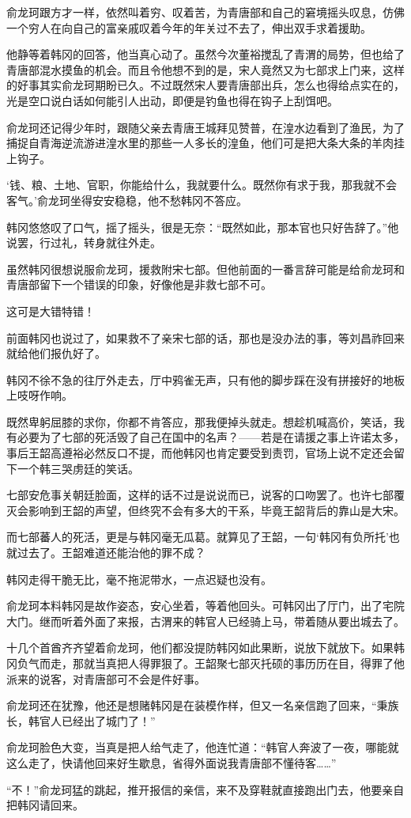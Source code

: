 俞龙珂跟方才一样，依然叫着穷、叹着苦，为青唐部和自己的窘境摇头叹息，仿佛一个穷人在向自己的富亲戚叹着今年的年关过不去了，伸出双手求着援助。

他静等着韩冈的回答，他当真心动了。虽然今次董裕搅乱了青渭的局势，但也给了青唐部混水摸鱼的机会。而且令他想不到的是，宋人竟然又为七部求上门来，这样的好事其实俞龙珂期盼已久。不过既然宋人要青唐部出兵，怎么也得给点实在的，光是空口说白话如何能引人出动，即便是钓鱼也得在钩子上刮饵吧。

俞龙珂还记得少年时，跟随父亲去青唐王城拜见赞普，在湟水边看到了渔民，为了捕捉自青海逆流游进湟水里的那些一人多长的湟鱼，他们可是把大条大条的羊肉挂上钩子。

‘钱、粮、土地、官职，你能给什么，我就要什么。既然你有求于我，那我就不会客气。’俞龙珂坐得安安稳稳，他不愁韩冈不答应。

韩冈悠悠叹了口气，摇了摇头，很是无奈：“既然如此，那本官也只好告辞了。”他说罢，行过礼，转身就往外走。

虽然韩冈很想说服俞龙珂，援救附宋七部。但他前面的一番言辞可能是给俞龙珂和青唐部留下一个错误的印象，好像他是非救七部不可。

这可是大错特错！

前面韩冈也说过了，如果救不了亲宋七部的话，那也是没办法的事，等刘昌祚回来就给他们报仇好了。

韩冈不徐不急的往厅外走去，厅中鸦雀无声，只有他的脚步踩在没有拼接好的地板上吱呀作响。

既然卑躬屈膝的求你，你都不肯答应，那我便掉头就走。想趁机喊高价，笑话，我有必要为了七部的死活毁了自己在国中的名声？——若是在请援之事上许诺太多，事后王韶高遵裕必然反口不提，而他韩冈也肯定要受到责罚，官场上说不定还会留下一个韩三哭虏廷的笑话。

七部安危事关朝廷脸面，这样的话不过是说说而已，说客的口吻罢了。也许七部覆灭会影响到王韶的声望，但终究不会有多大的干系，毕竟王韶背后的靠山是大宋。

而七部蕃人的死活，更是与韩冈毫无瓜葛。就算见了王韶，一句‘韩冈有负所托’也就过去了。王韶难道还能治他的罪不成？

韩冈走得干脆无比，毫不拖泥带水，一点迟疑也没有。

俞龙珂本料韩冈是故作姿态，安心坐着，等着他回头。可韩冈出了厅门，出了宅院大门。继而听着外面了来报，古渭来的韩官人已经骑上马，带着随从要出城去了。

十几个首酋齐齐望着俞龙珂，他们都没提防韩冈如此果断，说放下就放下。如果韩冈负气而走，那就当真把人得罪狠了。王韶聚七部灭托硕的事历历在目，得罪了他派来的说客，对青唐部可不会是件好事。

俞龙珂还在犹豫，他还是想赌韩冈是在装模作样，但又一名亲信跑了回来，“秉族长，韩官人已经出了城门了！”

俞龙珂脸色大变，当真是把人给气走了，他连忙道：“韩官人奔波了一夜，哪能就这么走了，快请他回来好生歇息，省得外面说我青唐部不懂待客……”

“不！”俞龙珂猛的跳起，推开报信的亲信，来不及穿鞋就直接跑出门去，他要亲自把韩冈请回来。

